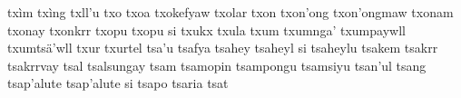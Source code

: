txìm\hspace{2mm}
txìng\hspace{2mm}
txll'u\hspace{2mm}
txo\hspace{2mm}
txoa\hspace{2mm}
txokefyaw\hspace{2mm}
txolar\hspace{2mm}
txon\hspace{2mm}
txon'ong\hspace{2mm}
txon'ongmaw\hspace{2mm}
txonam\hspace{2mm}
txonay\hspace{2mm}
txonkrr\hspace{2mm}
txopu\hspace{2mm}
txopu si\hspace{2mm}
txukx\hspace{2mm}
txula\hspace{2mm}
txum\hspace{2mm}
txumnga'\hspace{2mm}
txumpaywll\hspace{2mm}
txumtsä'wll\hspace{2mm}
txur\hspace{2mm}
txurtel\hspace{2mm}
tsa'u\hspace{2mm}
tsafya\hspace{2mm}
tsahey\hspace{2mm}
tsaheyl si\hspace{2mm}
tsaheylu\hspace{2mm}
tsakem\hspace{2mm}
tsakrr\hspace{2mm}
tsakrrvay\hspace{2mm}
tsal\hspace{2mm}
tsalsungay\hspace{2mm}
tsam\hspace{2mm}
tsamopin\hspace{2mm}
tsampongu\hspace{2mm}
tsamsiyu\hspace{2mm}
tsan'ul\hspace{2mm}
tsang\hspace{2mm}
tsap'alute\hspace{2mm}
tsap'alute si\hspace{2mm}
tsapo\hspace{2mm}
tsaria\hspace{2mm}
tsat\hspace{2mm}
